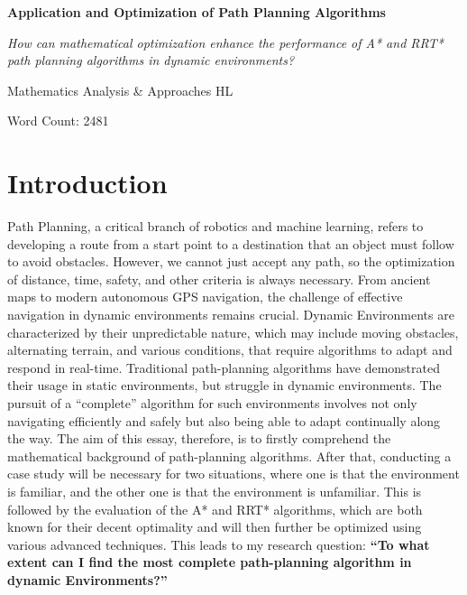 \documentclass[12pt]{article}
\begin{document}
\begin{titlepage}
    \centering
    
    {\Huge\bfseries Application and Optimization of Path Planning Algorithms\par}
    
    \vspace{1in}
    
    {\Large\itshape How can mathematical optimization enhance the performance of A* and RRT* path planning algorithms in dynamic environments?\par}
    
    \vspace{1in}
    
    {\Large Mathematics Analysis \& Approaches HL\par}

    \vspace{1in}
    
    {\Large Word Count: 2481\par} 

\end{titlepage}
\tableofcontents

\newpage
\section{Introduction}
Path Planning, a critical branch of robotics and machine learning, refers to developing a route from a start point to a destination that an object must follow to avoid obstacles. However, we cannot just accept any path, so the optimization of distance, time, safety, and other criteria is always necessary. 
From ancient maps to modern autonomous GPS navigation, the challenge of effective navigation in dynamic environments remains crucial. Dynamic Environments are characterized by their unpredictable nature, which may include moving obstacles, alternating terrain, and various conditions, that require algorithms to adapt and respond in real-time. Traditional path-planning algorithms have demonstrated their usage in static environments, but struggle in dynamic environments. 
The pursuit of a “complete” algorithm for such environments involves not only navigating efficiently and safely but also being able to adapt continually along the way. The aim of this essay, therefore, is to firstly comprehend the mathematical background of path-planning algorithms. After that, conducting a case study will be necessary for two situations, where one is that the environment is familiar, and the other one is that the environment is unfamiliar. This is followed by the evaluation of the A* and RRT* algorithms, which are both known for their decent optimality and will then further be optimized using various advanced techniques. This leads to my research question: \textbf{“To what extent can I find the most complete path-planning algorithm in dynamic Environments?”}
\end{document}
